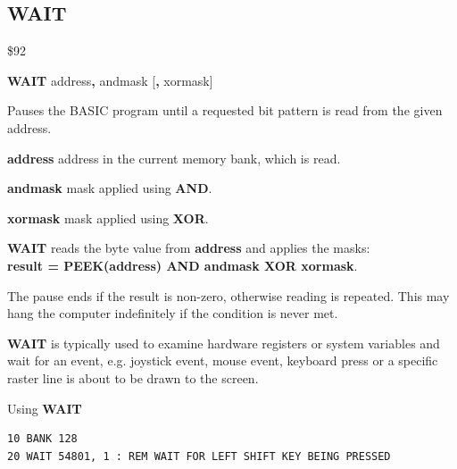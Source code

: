 \subsection{WAIT}
\begin{description}[leftmargin=2cm,style=nextline]
\item [Token:]    \$92

\item [Format:]   {\bf WAIT} address{\bf,} andmask [{\bf,} xormask]

\item [Usage:]    Pauses the BASIC program until a requested bit pattern is read from the given address.

                  {\bf address} address in the current memory bank, which is read.

                  {\bf andmask} mask applied using {\bf AND}.

                  {\bf xormask} mask applied using {\bf XOR}.

                  {\bf WAIT} reads the byte value from {\bf address} and applies the masks: \\
                  {\bf result = PEEK(address) AND andmask XOR xormask}.

                  The pause ends if the result is non-zero, otherwise reading is repeated. This may hang the computer indefinitely if the condition is never met.

\item [Remarks:]  {\bf WAIT} is typically used to examine hardware registers or system variables and wait for an event, e.g. joystick event, mouse event, keyboard press or a specific raster line is about to be drawn to the screen.

\item [Example:]  Using {\bf WAIT}

\begin{tcolorbox}[colback=black,coltext=white]
\verbatimfont{\codefont}
\begin{verbatim}
10 BANK 128
20 WAIT 54801, 1 : REM WAIT FOR LEFT SHIFT KEY BEING PRESSED
\end{verbatim}
\end{tcolorbox}
\end{description}


\newpage
